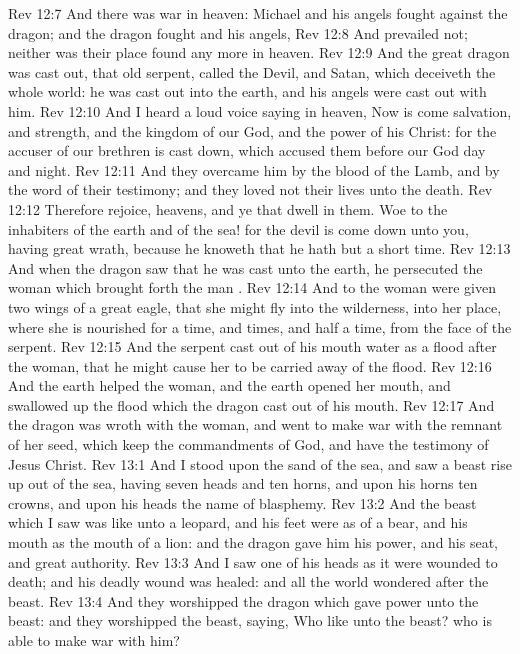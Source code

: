 \vs Rev 12:7 And there was war in heaven: Michael and his angels fought against the dragon; and the dragon fought and his angels,
\vs Rev 12:8 And prevailed not; neither was their place found any more in heaven.
\vs Rev 12:9 And the great dragon was cast out, that old serpent, called the Devil, and Satan, which deceiveth the whole world: he was cast out into the earth, and his angels were cast out with him.
\vs Rev 12:10 And I heard a loud voice saying in heaven, Now is come salvation, and strength, and the kingdom of our God, and the power of his Christ: for the accuser of our brethren is cast down, which accused them before our God day and night.
\vs Rev 12:11 And they overcame him by the blood of the Lamb, and by the word of their testimony; and they loved not their lives unto the death.
\vs Rev 12:12 Therefore rejoice,  heavens, and ye that dwell in them. Woe to the inhabiters of the earth and of the sea! for the devil is come down unto you, having great wrath, because he knoweth that he hath but a short time.
\vs Rev 12:13 And when the dragon saw that he was cast unto the earth, he persecuted the woman which brought forth the man .
\vs Rev 12:14 And to the woman were given two wings of a great eagle, that she might fly into the wilderness, into her place, where she is nourished for a time, and times, and half a time, from the face of the serpent.
\vs Rev 12:15 And the serpent cast out of his mouth water as a flood after the woman, that he might cause her to be carried away of the flood.
\vs Rev 12:16 And the earth helped the woman, and the earth opened her mouth, and swallowed up the flood which the dragon cast out of his mouth.
\vs Rev 12:17 And the dragon was wroth with the woman, and went to make war with the remnant of her seed, which keep the commandments of God, and have the testimony of Jesus Christ.
\vs Rev 13:1 And I stood upon the sand of the sea, and saw a beast rise up out of the sea, having seven heads and ten horns, and upon his horns ten crowns, and upon his heads the name of blasphemy.
\vs Rev 13:2 And the beast which I saw was like unto a leopard, and his feet were as  of a bear, and his mouth as the mouth of a lion: and the dragon gave him his power, and his seat, and great authority.
\vs Rev 13:3 And I saw one of his heads as it were wounded to death; and his deadly wound was healed: and all the world wondered after the beast.
\vs Rev 13:4 And they worshipped the dragon which gave power unto the beast: and they worshipped the beast, saying, Who  like unto the beast? who is able to make war with him?

